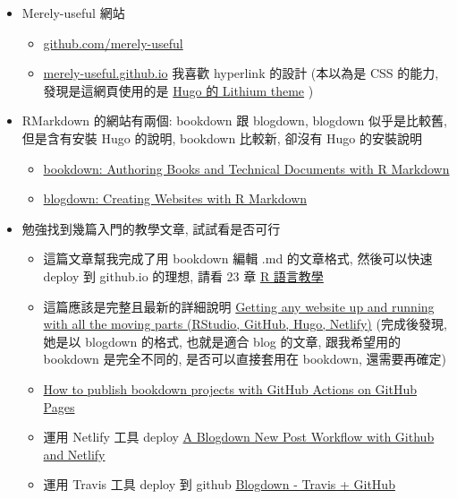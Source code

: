\documentclass[
]{book}
\providecommand{\tightlist}{%
  \setlength{\itemsep}{0pt}\setlength{\parskip}{0pt}}
\begin{document}
\begin{itemize}
\tightlist
\item
  Merely-useful 網站

  \begin{itemize}
  \tightlist
  \item
    \href{https://github.com/merely-useful/merely-useful.github.io}{github.com/merely-useful}\\
  \item
    \href{https://merely-useful.github.io}{merely-useful.github.io} 我喜歡 hyperlink 的設計 (本以為是 CSS 的能力, 發現是這網頁使用的是 \href{https://themes.gohugo.io/hugo-lithium-theme/}{Hugo 的 Lithium theme} )
  \end{itemize}
\item
  RMarkdown 的網站有兩個: {bookdown} 跟 {blogdown}, blogdown 似乎是比較舊, 但是含有安裝 Hugo 的說明, bookdown 比較新, 卻沒有 Hugo 的安裝說明

  \begin{itemize}
  \tightlist
  \item
    \href{https://bookdown.org/yihui/bookdown/get-started.html}{bookdown: Authoring Books and Technical Documents with R Markdown}\\
  \item
    \href{https://bookdown.org/yihui/blogdown/get-started.html}{blogdown: Creating Websites with R Markdown}
  \end{itemize}
\item
  勉強找到幾篇入門的教學文章, 試試看是否可行

  \begin{itemize}
  \tightlist
  \item
    這篇文章幫我完成了用 bookdown 編輯 .md 的文章格式, 然後可以快速 deploy 到 github.io 的理想, 請看 23 章 \href{https://www.math.pku.edu.cn/teachers/lidf/docs/Rbook/html/_Rbook/bookdown.html}{R 語言教學}\\
  \item
    這篇應該是完整且最新的詳細說明 \href{https://alison.rbind.io/post/new-year-new-blogdown/}{Getting any website up and running with all the moving parts (RStudio, GitHub, Hugo, Netlify)} (完成後發現, 她是以 blogdown 的格式, 也就是適合 blog 的文章, 跟我希望用的 bookdown 是完全不同的, 是否可以直接套用在 bookdown, 還需要再確定)\\
  \item
    \href{https://medium.com/@delucmat/how-to-publish-bookdown-projects-with-github-actions-on-github-pages-6e6aecc7331e}{How to publish bookdown projects with GitHub Actions on GitHub Pages}\\
  \item
    運用 Netlify 工具 deploy \href{https://www.garrickadenbuie.com/blog/blogdown-netlify-new-post-workflow/}{A Blogdown New Post Workflow with Github and Netlify}\\
  \item
    運用 Travis 工具 deploy 到 github \href{https://bookdown.org/yihui/blogdown/travis-github.html}{Blogdown - Travis + GitHub}
  \end{itemize}
\end{itemize}
\end{document}
